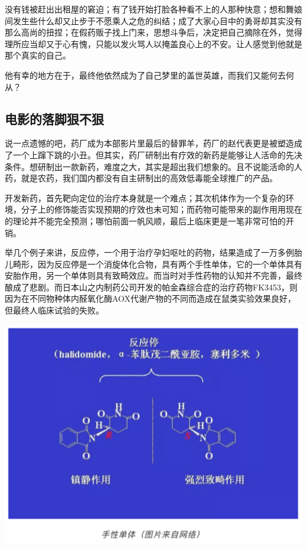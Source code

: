 \documentclass[
]{book}
\begin{document}
没有钱被赶出出租屋的窘迫；有了钱开始打脸各种看不上的人那种快意；想和舞娘间发生些什么却又止步于不愿乘人之危的纠结；成了大家心目中的勇哥却其实没有那么高尚的扭捏；在假药贩子找上门来，思想斗争后，决定把自己摘除在外，觉得理所应当却又于心有愧，只能以发火骂人以掩盖良心上的不安。让人感觉到他就是那个真实的自己。

他有幸的地方在于，最终他依然成为了自己梦里的盖世英雄，而我们又能何去何从？

\hypertarget{ux7535ux5f71ux7684ux843dux811aux72e0ux4e0dux72e0}{%
\subsection{电影的落脚狠不狠}\label{ux7535ux5f71ux7684ux843dux811aux72e0ux4e0dux72e0}}

说一点遗憾的吧，药厂成为本部影片里最后的替罪羊，药厂的赵代表更是被塑造成了一个上蹿下跳的小丑。但其实，药厂研制出有疗效的新药是能够让人活命的先决条件。想研制出一款新药，难度之大，其实是超出我们想象的。且不说能活命的人药，就是农药，我们国内都没有自主研制出的高效低毒能全球推广的产品。

开发新药，首先靶向定位的治疗本身就是一个难点；其次机体作为一个复杂的环境，分子上的修饰能否实现预期的疗效也未可知；而药物可能带来的副作用用现在的理论并不能完全预测；哪怕前面一帆风顺，最后上临床更是一笔非常可怕的开销。

举几个例子来讲，反应停，一个用于治疗孕妇呕吐的药物，结果造成了一万多例胎儿畸形，因为反应停是一个消旋体化合物，具有两个手性单体，它的一个单体具有安胎作用，另一个单体则具有致畸效应。而当时对手性药物的认知并不完善，最终酿成了悲剧。而日本山之内制药公司开发的帕金森综合症的治疗药物FK3453，则因为在不同物种体内醛氧化酶AOX代谢产物的不同而造成在鼠类实验效果良好，但最终人临床试验的失败。

\includegraphics[width=6.67in]{images/yaoshen2}
\end{document}
